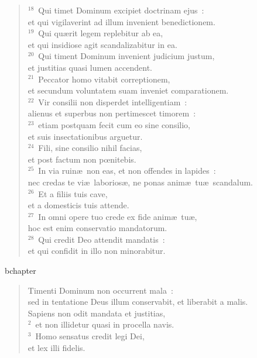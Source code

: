 \begin{verse}${}^{18}$~Qui timet Dominum excipiet doctrinam ejus~:\\ et qui vigilaverint ad illum invenient benedictionem.\\
${}^{19}$~Qui qu\ae rit legem replebitur ab ea,\\ et qui insidiose agit scandalizabitur in ea.\\
${}^{20}$~Qui timent Dominum invenient judicium justum,\\ et justitias quasi lumen accendent.\\
${}^{21}$~Peccator homo vitabit correptionem,\\ et secundum voluntatem suam inveniet comparationem.\\
${}^{22}$~Vir consilii non disperdet intelligentiam~:\\ alienus et superbus non pertimescet timorem~:\\
${}^{23}$~etiam postquam fecit cum eo sine consilio,\\ et suis insectationibus arguetur.\\
${}^{24}$~Fili, sine consilio nihil facias,\\ et post factum non pœnitebis.\\
${}^{25}$~In via ruin\ae\ non eas, et non offendes in lapides~:\\ nec credas te vi\ae\ laborios\ae , ne ponas anim\ae\ tu\ae\ scandalum.\\
${}^{26}$~Et a filiis tuis cave,\\ et a domesticis tuis attende.\\
${}^{27}$~In omni opere tuo crede ex fide anim\ae\ tu\ae ,\\ hoc est enim conservatio mandatorum.\\
${}^{28}$~Qui credit Deo attendit mandatis~:\\ et qui confidit in illo non minorabitur.\end{verse}


bchapter\begin{verse}\vspace{-19pt}Timenti Dominum non occurrent mala~:\\ sed in tentatione Deus illum conservabit, et liberabit a malis.\\ Sapiens non odit mandata et justitias,\\
${}^{2}$~et non illidetur quasi in procella navis.\\
${}^{3}$~Homo sensatus credit legi Dei,\\ et lex illi fidelis.\end{verse}


